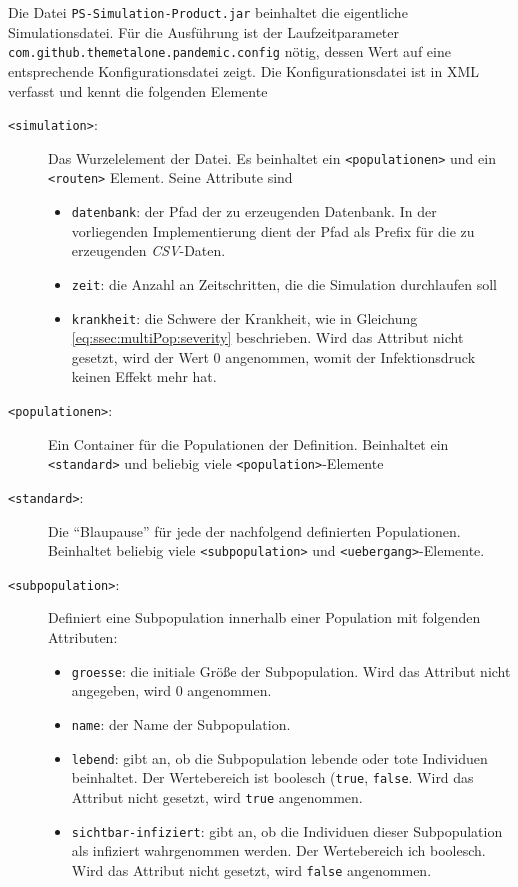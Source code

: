 Die Datei \texttt{PS-Simulation-Product.jar} beinhaltet die eigentliche Simulationsdatei. Für die Ausführung ist der Laufzeitparameter \texttt{com.github.themetalone.pandemic.config} nötig, dessen Wert auf eine entsprechende Konfigurationsdatei zeigt. Die Konfigurationsdatei ist in XML verfasst und kennt die folgenden Elemente
\begin{description}
\item[\texttt{<simulation>}:] Das Wurzelelement der Datei. Es beinhaltet ein \texttt{<populationen>} und ein \texttt{<routen>} Element. Seine Attribute sind \begin{itemize}
	\item \texttt{datenbank}: der Pfad der zu erzeugenden Datenbank. In der vorliegenden Implementierung dient der Pfad als Prefix für die zu erzeugenden \emph{CSV}-Daten. 
	\item \texttt{zeit}: die Anzahl an Zeitschritten, die die Simulation durchlaufen soll
	\item \texttt{krankheit}: die Schwere der Krankheit, wie in Gleichung \ref{eq:ssec:multiPop:severity} beschrieben. Wird das Attribut nicht gesetzt, wird der Wert $0$ angenommen, womit der Infektionsdruck keinen Effekt mehr hat.
\end{itemize}
\item[\texttt{<populationen>}:] Ein Container für die Populationen der Definition. Beinhaltet ein \texttt{<standard>} und beliebig viele \texttt{<population>}-Elemente
\item[\texttt{<standard>}:] Die ``Blaupause'' für jede der nachfolgend definierten Populationen. Beinhaltet beliebig viele \texttt{<subpopulation>} und \texttt{<uebergang>}-Elemente. 
\item[\texttt{<subpopulation>}:] Definiert eine Subpopulation innerhalb einer Population mit folgenden Attributen:\begin{itemize}
\item \texttt{groesse}: die initiale Größe der Subpopulation. Wird das Attribut nicht angegeben, wird $0$ angenommen.
\item \texttt{name}: der Name der Subpopulation. 
\item \texttt{lebend}: gibt an, ob die Subpopulation lebende oder tote Individuen beinhaltet. Der Wertebereich ist boolesch (\texttt{true}, \texttt{false}. Wird das Attribut nicht gesetzt, wird \texttt{true} angenommen.
\item \texttt{sichtbar-infiziert}: gibt an, ob die Individuen dieser Subpopulation als infiziert wahrgenommen werden. Der Wertebereich ich boolesch. Wird das Attribut nicht gesetzt, wird \texttt{false} angenommen.

\end{itemize}
\end{description}
